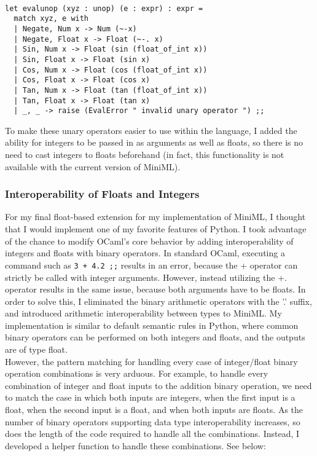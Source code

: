 \documentclass{article}
\begin{document}
\begin{verbatim}

let evalunop (xyz : unop) (e : expr) : expr = 
  match xyz, e with 
  | Negate, Num x -> Num (~-x)
  | Negate, Float x -> Float (~-. x)
  | Sin, Num x -> Float (sin (float_of_int x))
  | Sin, Float x -> Float (sin x)
  | Cos, Num x -> Float (cos (float_of_int x))
  | Cos, Float x -> Float (cos x)
  | Tan, Num x -> Float (tan (float_of_int x))
  | Tan, Float x -> Float (tan x)
  | _, _ -> raise (EvalError " invalid unary operator ") ;;
\end{verbatim}

To make these unary operators easier to use within the language, I added the ability for integers to be passed in as arguments as well as floats, so there is no need to cast integers to floats beforehand (in fact, this functionality is not available with the current version of MiniML). 

\subsubsection{Interoperability of Floats and Integers}

For my final float-based extension for my implementation of MiniML, I thought that I would implement one of my favorite features of Python. I took advantage of the chance to modify OCaml's core behavior by adding interoperability of integers and floats with binary operators. In standard OCaml, executing a command such as \texttt{3 + 4.2 ;;} results in an error, because the + operator can strictly be called with integer arguments. However, instead utilizing the +. operator results in the same issue, because both arguments have to be floats. In order to solve this, I eliminated the binary arithmetic operators with the '.' suffix, and introduced arithmetic interoperability between types to MiniML. My implementation is similar to default semantic rules in Python, where common binary operators can be performed on both integers and floats, and the outputs are of type float. \\

However, the pattern matching for handling every case of integer/float binary operation combinations is very arduous. For example, to handle every combination of integer and float inputs to the addition binary operation, we need to match the case in which both inputs are integers, when the first input is a float, when the second input is a float, and when both inputs are floats. As the number of binary operators supporting data type interoperability increases, so does the length of the code required to handle all the combinations. Instead, I developed a helper function to handle these combinations. See below:
\end{document}
